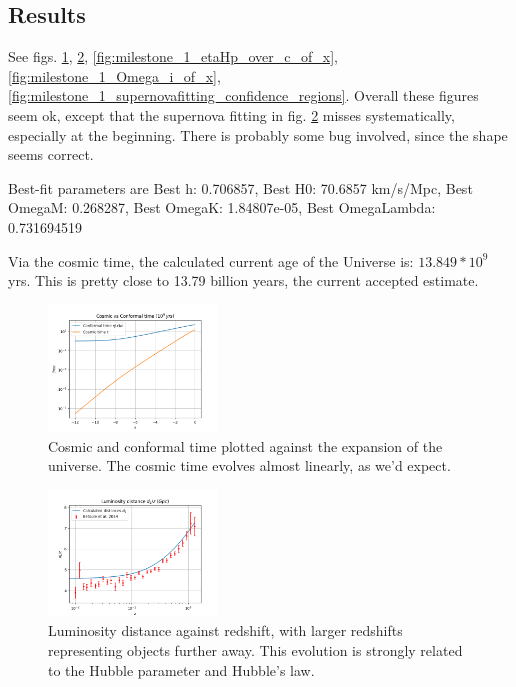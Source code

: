 \subsection{Results}
See figs. \ref{fig:milestone_1_cosmic_vs_conformal_time}, \ref{fig:milestone_1_luminosity_distance}, \ref{fig:milestone_1_etaHp_over_c_of_x}, \ref{fig:milestone_1_Omega_i_of_x}, \ref{fig:milestone_1_supernovafitting_confidence_regions}. Overall these figures seem ok, except that the supernova fitting in fig. \ref{fig:milestone_1_luminosity_distance} misses systematically, especially at the beginning. There is probably some bug involved, since the shape seems correct.

Best-fit parameters are
Best h: 0.706857,
Best H0: 70.6857 km/s/Mpc,
Best OmegaM: 0.268287,
Best OmegaK: 1.84807e-05,
Best OmegaLambda: 0.731694519

Via the cosmic time, the calculated current age of the Universe is: $13.849 * 10^9$ yrs.
This is pretty close to 13.79 billion years, the current accepted estimate.

\begin{figure}[h!tbp]
\centering
\includegraphics[width=0.4\textwidth]{../Milestone 1/Plots/cosmic_vs_conformal_time.png}
\caption{Cosmic and conformal time plotted against the expansion of the universe. The cosmic time evolves almost linearly, as we'd expect.}
\label{fig:milestone_1_cosmic_vs_conformal_time}
\end{figure}

\begin{figure}[h!tbp]
\centering
\includegraphics[width=0.4\textwidth]{../Milestone 1/Plots/luminosity_distance.png}
\caption{Luminosity distance against redshift, with larger redshifts representing objects further away. This evolution is strongly related to the Hubble parameter and Hubble's law.}
\label{fig:milestone_1_luminosity_distance}
\end{figure}

